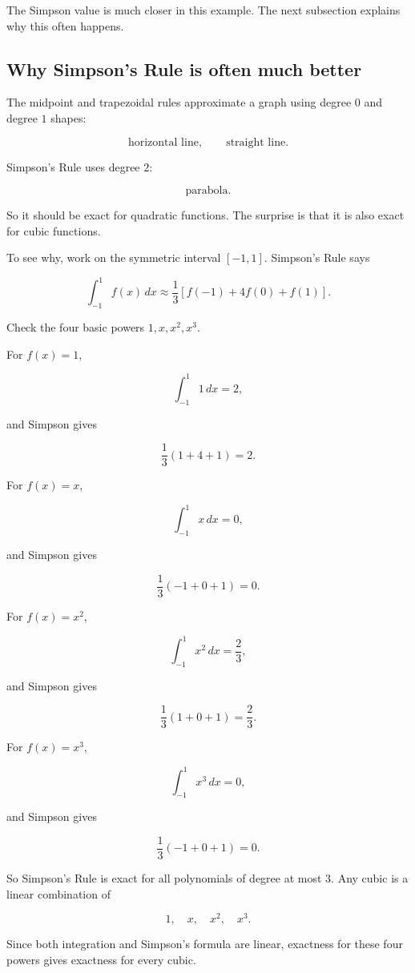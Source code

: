 The Simpson value is much closer in this example.  The next subsection explains why
this often happens.

\subsection{Why Simpson's Rule is often much better}
\label{subsec:why-simpson-rule-better}

The midpoint and trapezoidal rules approximate a graph using degree \(0\) and degree
\(1\) shapes:

\[
\text{horizontal line},
\qquad
\text{straight line}.
\]

Simpson's Rule uses degree \(2\):

\[
\text{parabola}.
\]

So it should be exact for quadratic functions.  The surprise is that it is also exact for
cubic functions.

To see why, work on the symmetric interval \([-1,1]\).  Simpson's Rule says

\[
\int_{-1}^{1} f(x)\,dx
\approx
\frac13\left[f(-1)+4f(0)+f(1)\right].
\]

Check the four basic powers \(1,x,x^2,x^3\).

For \(f(x)=1\),

\[
\int_{-1}^{1}1\,dx=2,
\]

and Simpson gives

\[
\frac13(1+4+1)=2.
\]

For \(f(x)=x\),

\[
\int_{-1}^{1}x\,dx=0,
\]

and Simpson gives

\[
\frac13(-1+0+1)=0.
\]

For \(f(x)=x^2\),

\[
\int_{-1}^{1}x^2\,dx=\frac23,
\]

and Simpson gives

\[
\frac13(1+0+1)=\frac23.
\]

For \(f(x)=x^3\),

\[
\int_{-1}^{1}x^3\,dx=0,
\]

and Simpson gives

\[
\frac13(-1+0+1)=0.
\]

So Simpson's Rule is exact for all polynomials of degree at most \(3\).  Any cubic is a
linear combination of

\[
1,\quad x,\quad x^2,\quad x^3.
\]

Since both integration and Simpson's formula are linear, exactness for these four
powers gives exactness for every cubic.

